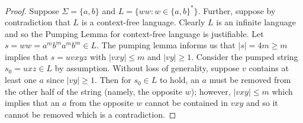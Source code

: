 \documentclass[ 12pt ]{article}
\begin{document}
\begin{enumerate}
		\begin{proof}
			Suppose $\Sigma = \{ a, b \}$ and $L = \{ ww : w \in \{ a, b \}^* \}$. Further, suppose by contradiction that $L$ is a context-free language. Clearly $L$ is an infinite
			language and so the Pumping Lemma for context-free language is justifiable. Let $s = ww = a^m b^m a^m b^m \in L$. The pumping lemma informs us that $|s| = 4m \geq m$ implies
			that $s = uvxyz$ with $|vxy| \leq m$ and $|vy| \geq 1$. Consider the pumped string $s_0 = uxz \in L$ by assumption. Without loss of generality, suppose $v$ contains at least
			one $a$ since $|vy| \geq 1$. Then for $s_0 \in L$ to hold, an $a$ must be removed from the other half of the string (namely, the opposite $w$); however, $|vxy| \leq m$ which
			implies that an $a$ from the opposite $w$ cannot be contained in $vxy$ and so it cannot be removed which is a contradiction.
		\end{proof}
\end{enumerate}
\end{document}
